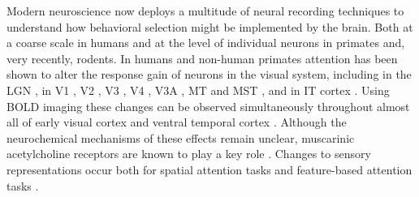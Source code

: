 Modern neuroscience now deploys a multitude of neural recording techniques to understand how behavioral selection might be implemented by the brain. Both at a coarse scale in humans and at the level of individual neurons in primates and, very recently, rodents. In humans and non-human primates attention has been shown to alter the response gain of neurons in the visual system, including in the LGN \citep{OConnor2002-mx}, in V1 \citep{Motter1993-av}, V2 \citep{Buffalo2010-lr,Luck1997-sq,Motter1993-av}, V3 \citep{Liu2007-jx,Pestilli2011-gi,Saenz2002-fs,Silver2007-vd}, V4 \citep{Buffalo2010-lr,Connor1996-nm,Luck1997-sq,McAdams1999-jy,Moran1985-cv,Motter1993-av,Reynolds2000-mg,Spitzer1988-ib}, V3A \citep{Serences2007-le},  MT \citep{Beauchamp1997-rh,OCraven1997-ej,Saenz2002-fs,Seidemann1999-oz,Serences2007-le,Treue1999-mp,Treue1996-ez} and MST \citep{OCraven1997-ej,Treue1996-ez}, and in IT cortex \citep{Chelazzi1998-gx,Moran1985-cv}. Using BOLD imaging these changes can be observed simultaneously throughout almost all of early visual cortex \citep{Liu2007-jx,Pestilli2011-gi,Saenz2002-fs,Silver2007-vd} and ventral temporal cortex \citep{Baldauf2014-uj}. Although the neurochemical mechanisms of these effects remain unclear, muscarinic acetylcholine receptors are known to play a key role \citep{Herrero2008-am}. Changes to sensory representations occur both for spatial attention tasks \citep{Klein2014-oe,McAdams1999-jy,Mitchell2009-do,Pestilli2011-gi,Womelsdorf2006-np} and feature-based attention tasks \citep{Baldauf2014-uj,Harel2014-wd,Huk2000-uj,Jehee2011-mb,Saenz2002-fs,Saenz2003-qz,Serences2007-le,Treue1999-mp}.

